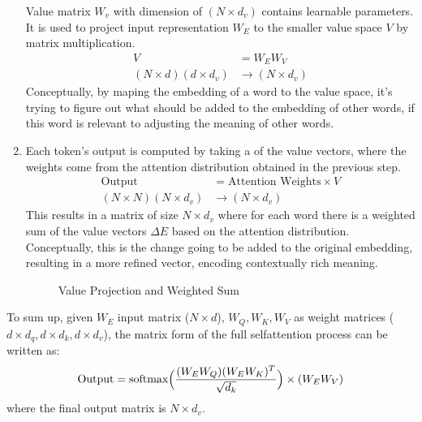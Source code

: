 \documentclass[letterpaper,11pt,english]{sphinxmanual}
\begin{document}
\begin{enumerate}
\sphinxAtStartPar
Value matrix \(W_v\) with dimension of \((N \times d_v)\)
contains learnable parameters. It is used to project input
representation \(W_E\) to the smaller value space \(V\) by
matrix multiplication.
\begin{equation*}
\begin{split}V &= W_E W_V \\
(N \times d) (d \times d_v) &\rightarrow (N \times d_v)\end{split}
\end{equation*}
\sphinxAtStartPar
Conceptually, by maping the embedding of a word to the value space,
it’s trying to figure out what should be added to the embedding of
other words, if this word is relevant to adjusting the meaning of
other words.

\item {} 
\sphinxAtStartPar
{}

\sphinxAtStartPar
Each token’s output is computed by taking a  of the
value vectors, where the weights come from the attention distribution
obtained in the previous step.
\begin{equation*}
\begin{split}\text{Output} &= \text{Attention Weights} \times V\\
(N \times N) (N \times d_v) &\rightarrow (N \times d_v)\end{split}
\end{equation*}
\sphinxAtStartPar
This results in a matrix of size \(N \times d_v\) where for each
word there is a weighted sum of the value vectors \(\Delta E\)
based on the attention distribution. Conceptually, this is the change
going to be added to the original embedding, resulting in a more
refined vector, encoding contextually rich meaning.

\begin{figure}[htbp]
\centering
\capstart

\noindent{}
\caption{Value Projection and Weighted Sum}\label{\detokenize{pretraining:id18}}\end{figure}

\end{enumerate}

\sphinxAtStartPar
To sum up, given \(W_E\) input matrix (\(N \times d\)),
\(W_Q, W_K, W_V\) as weight matrices
(\(d\times d_q, d\times d_k, d\times d_v\)), the matrix form of the
full self\sphinxhyphen{}attention process can be written as:
\begin{equation*}
\begin{split}\text{Output} = \text{softmax}\Big({(W_EW_Q)(W_EW_K)^T \over \sqrt{d_k}}\Big) \times (W_EW_V)\end{split}
\end{equation*}
\sphinxAtStartPar
where the final output matrix is \(N \times d_v\).
\end{document}
